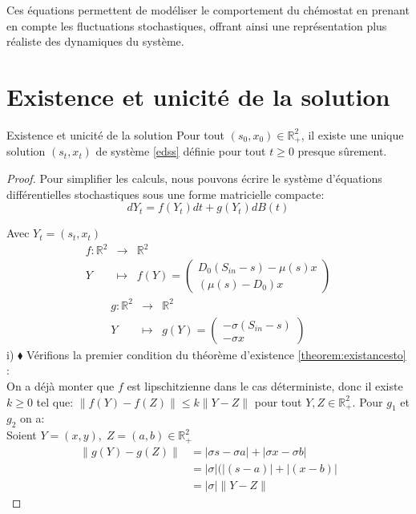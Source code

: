 \documentclass[12pt,a4paper]{report}%
\begin{document}
 Ces équations permettent de modéliser le comportement du chémostat en prenant en compte les fluctuations stochastiques, offrant ainsi une représentation plus réaliste des dynamiques du système.
 \section{Existence et unicité de la solution }
 \begin{théorème}{Existence et unicité de la solution}{}
 	Pour tout $(s_0, x_0) \in \mathbb{R}_+^2$, il existe une unique solution $(s_t, x_t)$ de système \eqref{edss} définie pour tout $t \geq 0$ presque sûrement.
 \end{théorème}
 \begin{proof}
 	Pour simplifier les calculs, nous pouvons écrire le système d'équations différentielles stochastiques sous une forme matricielle compacte:
 	\begin{equation}\label{ds1}
 		dY_t = f(Y_t)dt + g(Y_t)dB(t) 
 	\end{equation}
 	
 	Avec \( Y_t = (s_t, x_t) \)
 	$$
 	\begin{array}{rcl}
 		f:\mathbb{R}^2 &\to& \mathbb{R}^2\\
 		Y &\mapsto &f(Y)=\begin{pmatrix}
 			D_0(S_{in}-s) - \mu(s)x \\
 			(\mu(s)-D_0)x
 		\end{pmatrix}
 	\end{array}
 	$$
 	$$
 	\begin{array}{rcl}
 		g:\mathbb{R}^2 &\to& \mathbb{R}^2\\
 		Y &\mapsto &g(Y)=\begin{pmatrix}
 			-\sigma ( S_{in}-s) \\
 			-\sigma x
 		\end{pmatrix}
 	\end{array}
 	$$
 	i) $\blacklozenge$ Vérifions la premier condition du théorème d'existence \ref{theorem:existancesto} :\\
 	On a déjà monter que $f$ est lipschitzienne dans le cas déterministe, donc il existe $k\geqslant 0$ tel que: $\|f(Y)-f(Z)\| \leq k \|Y-Z\|$ pour tout $Y,Z \in \mathbb{R}^2_+$.
 	Pour $g_1$ et $g_2$ on a:\\
 	Soient $Y=(x,y), \;Z=(a, b) \in \mathbb{R}^2_+$ 
 	$$ 
 	\begin{aligned}
 		\|g(Y)-g(Z)\|&=|\sigma s -\sigma a|+|\sigma x -\sigma b|\\
 		&=|\sigma|( | (s -a)|+| (x -b)|\\
 		&= |\sigma| \|Y-Z\|
 	\end{aligned}
 	$$
 	

\end{proof}
\end{document}
